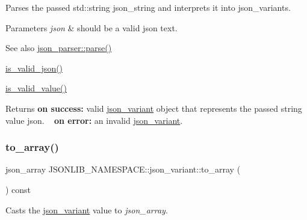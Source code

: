 Parses the passed std\+::string {\ttfamily json\+\_\+string} and interprets it into json\+\_\+variants. 


\begin{DoxyParams}{Parameters}
{\em json} & should be a valid json text. \\
\hline
\end{DoxyParams}
\begin{DoxySeeAlso}{See also}
\hyperlink{classJSONLIB__NAMESPACE_1_1json__parser_a8f097c29f98ed795a92b5941c9070f8b}{json\+\_\+parser\+::parse()} 

\hyperlink{classJSONLIB__NAMESPACE_1_1json__variant_a158e3148d9256af3d1b8251b2ca7b6c4}{is\+\_\+valid\+\_\+json()} 

\hyperlink{classJSONLIB__NAMESPACE_1_1json__variant_a224aab2dd56e3928dd893be8b7f3367a}{is\+\_\+valid\+\_\+value()} 
\end{DoxySeeAlso}
\begin{DoxyReturn}{Returns}
{\bfseries on success\+:} valid \hyperlink{classJSONLIB__NAMESPACE_1_1json__variant}{json\+\_\+variant} object that represents the passed string value {\ttfamily json}. ~\newline
 {\bfseries on error\+:} an invalid \hyperlink{classJSONLIB__NAMESPACE_1_1json__variant}{json\+\_\+variant}. 
\end{DoxyReturn}
\mbox{\label{classJSONLIB__NAMESPACE_1_1json__variant_a9c7e9d81370ff98393d2fd3ee00d013a}} 
\subsubsection{\texorpdfstring{to\+\_\+array()}{to\_array()}\hspace{0.1cm}{\footnotesize\ttfamily [1/2]}}
{\footnotesize\ttfamily json\+\_\+array J\+S\+O\+N\+L\+I\+B\+\_\+\+N\+A\+M\+E\+S\+P\+A\+C\+E\+::json\+\_\+variant\+::to\+\_\+array (\begin{DoxyParamCaption}{ }\end{DoxyParamCaption}) const}



Casts the \hyperlink{classJSONLIB__NAMESPACE_1_1json__variant}{json\+\_\+variant} value to {\itshape json\+\_\+array}. 


